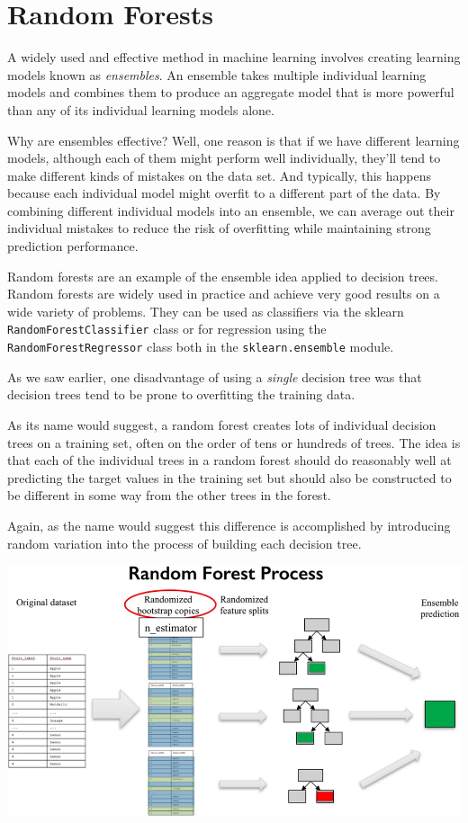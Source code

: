 \section{Random Forests}
\begin{multicols}{2}

A widely used and effective method in machine learning involves creating learning models known as \emph{ensembles}. An ensemble takes multiple individual learning models and combines them to produce an aggregate model that is more powerful than any of its individual learning models alone. 

Why are ensembles effective? Well, one reason is that if we have different learning models, although each of them might perform well individually, they'll tend to make different kinds of mistakes on the data set. And typically, this happens because each individual model might overfit to a different part of the data. By combining different individual models into an ensemble, we can average out their individual mistakes to reduce the risk of overfitting while maintaining strong prediction performance. 

Random forests are an example of the ensemble idea applied to decision trees. Random forests are widely used in practice and achieve very good results on a wide variety of problems. They can be used as classifiers via the sklearn \texttt{RandomForestClassifier} class or for regression using the \texttt{RandomForestRegressor} class both in the \texttt{sklearn.ensemble} module. 

As we saw earlier, one disadvantage of using a \emph{single} decision tree was that decision trees tend to be prone to overfitting the training data. 

As its name would suggest, a random forest creates lots of individual decision trees on a training set, often on the order of tens or hundreds of trees. The idea is that each of the individual trees in a random forest should do reasonably well at predicting the target values in the training set but should also be constructed to be different in some way from the other trees in the forest. 

Again, as the name would suggest this difference is accomplished by introducing random variation into the process of building each decision tree. 

\begin{center}
	\includegraphics[width=\linewidth]{img/Random-Forest-Process.png} 
\end{center}



\end{multicols}
